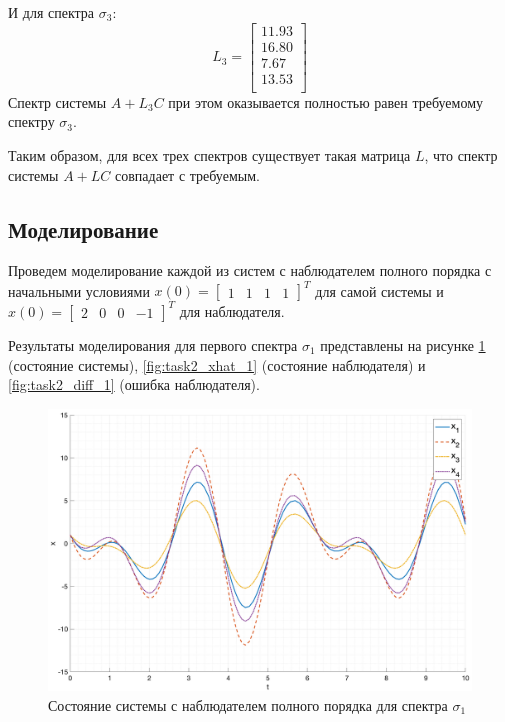 И для спектра $\sigma_3$:
\begin{equation}
    L_3 = \begin{bmatrix}
        11.93 \\ 
        16.80 \\ 
        7.67 \\ 
        13.53 \\ 
    \end{bmatrix}
\end{equation}
Спектр системы $A + L_3C$ при этом оказывается полностью равен требуемому спектру $\sigma_3$. 

Таким образом, для всех трех спектров существует такая матрица $L$, что спектр системы $A + LC$ совпадает с требуемым. 

\subsection{Моделирование}
Проведем моделирование каждой из систем с наблюдателем полного порядка с начальными условиями $x(0) = \begin{bmatrix} 1 & 1 & 1 & 1 \end{bmatrix}^T$ 
для самой системы и $\hat{x}(0) = \begin{bmatrix} 2 & 0 & 0 & -1 \end{bmatrix}^T$ для наблюдателя.

Результаты моделирования для первого спектра $\sigma_1$ представлены на рисунке \ref{fig:task2_x_1} (состояние системы), \ref{fig:task2_xhat_1} (состояние наблюдателя) и \ref{fig:task2_diff_1} (ошибка наблюдателя).
\begin{figure}[ht!]
    \centering
    \includegraphics[width=\textwidth]{media/plots/task2_x_1.png}
    \caption{Состояние системы с наблюдателем полного порядка для спектра $\sigma_1$}
    \label{fig:task2_x_1}
\end{figure}

